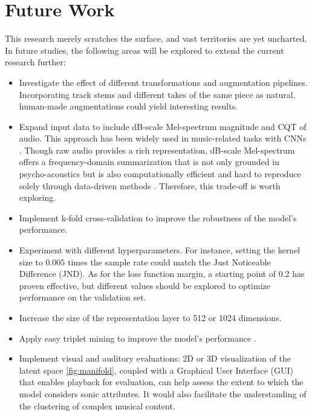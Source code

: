 \chapter{Future Work}

This research merely scratches the surface, and vast territories are yet uncharted. In future studies, the following areas will be explored to extend the current research further:

\begin{itemize}
  \item Investigate the effect of different transformations and augmentation pipelines. Incorporating track stems and different takes of the same piece as natural, human-made augmentations could yield interesting results.
  \item Expand input data to include dB-scale Mel-spectrum magnitude and CQT of audio. This approach has been widely used in music-related tasks with CNNs \cite{Kim2020OneStrategies}. Though raw audio provides a rich representation, dB-scale Mel-spectrum offers a frequency-domain summarization that is not only grounded in psycho-acoustics but is also computationally efficient and hard to reproduce solely through data-driven methods \cite{Kim2020OneStrategies}. Therefore, this trade-off is worth exploring.
  \item Implement k-fold cross-validation to improve the robustness of the model's performance.
  \item Experiment with different hyperparameters. For instance, setting the kernel size to $0.005$ times the sample rate could match the Just Noticeable Difference (JND). As for the loss function margin, a starting point of 0.2 has proven effective, but different values should be explored to optimize performance on the validation set.
  \item Increase the size of the representation layer to 512 or 1024 dimensions.
  \item Apply easy triplet mining to improve the model's performance \cite{XuanImprovedMining}.
  \item Implement visual and auditory evaluations: 2D or 3D visualization of the latent space \ref{fig:manifold}, coupled with a Graphical User Interface (GUI) that enables playback for evaluation, can help assess the extent to which the model considers sonic attributes. It would also facilitate the understanding of the clustering of complex musical content. 
\end{itemize}



\newpage